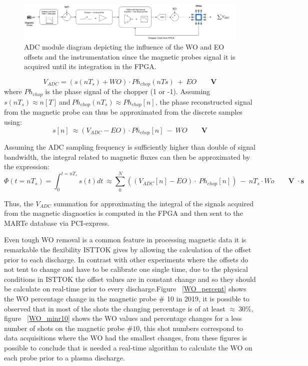 \begin{figure}[htbp]
	\centering
	\includegraphics[width=1\textwidth]{Chp4/ADC_FPGA.png}
	\caption{\label{ADC_FPGA} ADC module diagram depicting the influence of the WO and EO offsets and the instrumentation since the magnetic probes signal it is acquired until its integration in the FPGA. }
\end{figure}

\begin{equation}
V_{ADC}=(s(nT_s)+WO)\cdot Ph_{chop}(nTs)~+~EO \qquad \textbf{V}
\end{equation}
where $Ph_{chop}$ is the phase signal of the chopper (1 or -1). Assuming $s(nT_s)\approx n[T]~$and$~Ph_{chop}(nT_s)\approx Ph_{chop}[n] $, the phase reconstructed signal from the magnetic probe can thus be approximated from the discrete samples using:
\begin{equation}
s[n]~\approx (V_{ADC}-EO) \cdot Ph_{chop}[n]~-~WO\qquad \textbf{V}
\end{equation}

Assuming the ADC sampling frequency is sufficiently higher than double of signal bandwidth, the integral related to magnetic fluxes can then be approximated by the expression:
\smallskip
 \begin{equation}
 	\Phi (t=nT_s)=\int_{0}^{t=nT_s} s(t)dt~\approx \sum_{0}^{N} ((V_{ADC}[n]-EO)\cdot ~ Ph_{chop}[n])~-~nT_s\cdot Wo\qquad \textbf{V } \cdot \textbf{s}
 \end{equation}

Thus, the $V_{ADC}$ summation for approximating the integral of the signals acquired from the magnetic diagnostics is computed  in the FPGA and then sent to the MARTe database via PCI-express.\smallskip
 

Even tough  WO removal is a common feature in processing magnetic data it is remarkable the flexibility ISTTOK gives by allowing the calculation of the offset prior to each discharge. In contrast with other experiments where the offsets do not tent to change and have to be calibrate one single time, due to the physical conditions in ISTTOK the offset values are in constant change and so they should be calculate on real-time prior to  every discharge.Figure  ~\ref{WO_percent} shows the WO percentage change in the magnetic probe $\#$ 10  in 2019, it is possible to observed that in most of the shots the changing percentage is of at least $\approx~30\%$, figure   ~\ref{WO_minr10} shows the WO values and percentage changes for a less number of shots on the magnetic probe $\#10$, this shot numbers correspond to data acquisitions where the WO had the smallest changes, from these figures is possible to conclude that is needed a real-time algorithm to calculate the WO on each probe prior to a plasma discharge. \smallskip

